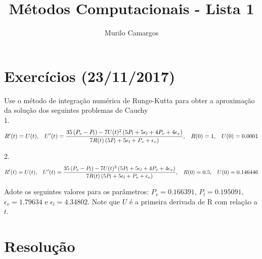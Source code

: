 \documentclass[10pt,a4paper]{article}
\author{Murilo Camargos}
\title{Métodos Computacionais - Lista 1}
\begin{document}


	\section{Exercícios (23/11/2017)}
	Use o método de integração numérica de Runge-Kutta para obter a aproximação da solução dos seguintes problemas de Cauchy\\
	
	1. \[R'(t)=U(t), \hspace{0.3cm} U'(t)=\frac{35\left(P_v-P_l\right) - 7U(t)^2\left(5P_l+5\epsilon_l+4P_v+4\epsilon_v\right)}{7R(t)\left(5P_l+5\epsilon_l+P_v+\epsilon_v\right)}, \hspace{0.3cm} R(0)=1, \hspace{0.3cm} U(0)=0.0001\]
	
	2. \[R'(t)=U(t), \hspace{0.3cm} U'(t)=\frac{35\left(P_v-P_l\right) - 7U(t)^2\left(5P_l+5\epsilon_l+4P_v+4\epsilon_v\right)}{7R(t)\left(5P_l+5\epsilon_l+P_v+\epsilon_v\right)}, \hspace{0.3cm} R(0)=0.5, \hspace{0.3cm} U(0)=0.146446\]
	
	Adote os seguintes valores para os parâmetros: $P_v=0.166391$, $P_l=0.195091$, $\epsilon_v=1.79634$ e $\epsilon_l=4.34802$. Note que $U$ é a primeira derivada de R com relação a $t$.
	
	\section{Resolução}
	
\end{document}
